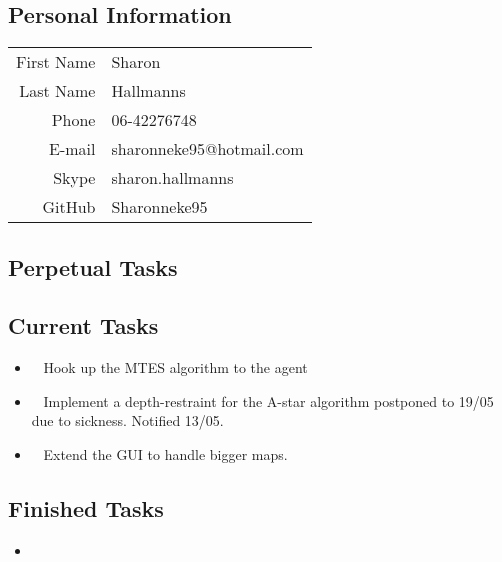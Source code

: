 \subsection{Personal Information}
\begin{table}[h!]
	\begin{tabular}{rl}
	    First Name 	& Sharon\\
	    Last Name	& Hallmanns\\
	    Phone		& 06-42276748\\
	    E-mail		& sharonneke95@hotmail.com\\
	    Skype		& sharon.hallmanns\\
	    GitHub		& Sharonneke95\\
    \end{tabular}
\end{table}

\subsection{Perpetual Tasks}

\subsection{Current Tasks}
\begin{itemize}
	\item~
	Hook up the MTES algorithm to the agent
	\item~
	Implement a depth-restraint for the A-star algorithm
		\subitem postponed to 19/05 due to sickness. Notified 13/05.
	\item~
	Extend the GUI to handle bigger maps.
\end{itemize}

\subsection{Finished Tasks}
\begin{itemize}
	\item
\end{itemize}